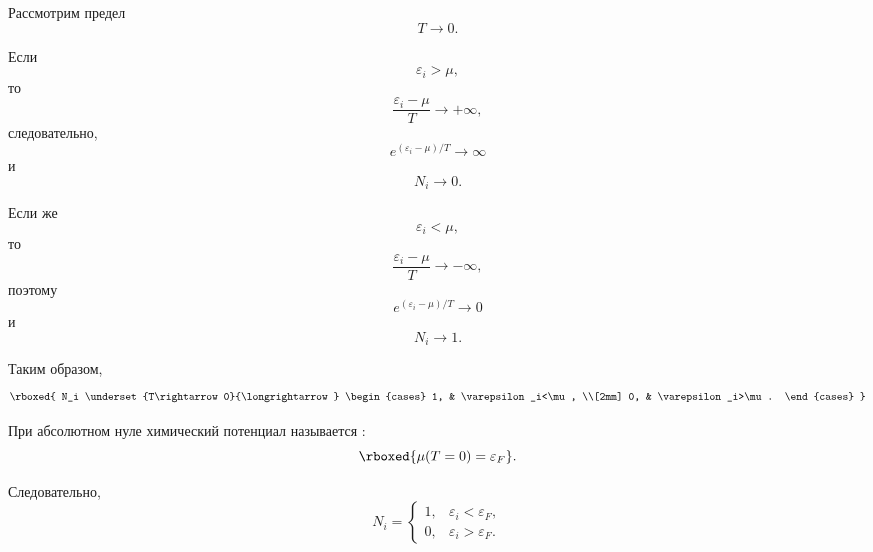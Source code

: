 \documentclass[../final.tex]{subfiles}
\begin{document}
Рассмотрим предел
%
\begin{equation*}
    T
    \rightarrow
    0.
\end{equation*}

Если
%
\begin{equation*}
    \varepsilon_i
    >
    \mu,
\end{equation*}
%
то
%
\begin{equation*}
    \frac{
        \varepsilon_i-\mu
    }{
        T
    }
    \rightarrow
    +\infty,
\end{equation*}
%
следовательно,
%
\begin{equation*}
    e^{(\varepsilon_i-\mu)/T}
    \rightarrow
    \infty
\end{equation*}
%
и
%
\begin{equation*}
    N_i
    \rightarrow
    0.
\end{equation*}

Если же
%
\begin{equation*}
    \varepsilon_i
    <
    \mu,
\end{equation*}
%
то
%
\begin{equation*}
    \frac{
        \varepsilon_i-\mu
    }{
        T
    }
    \rightarrow
    -\infty,
\end{equation*}
%
поэтому
%
\begin{equation*}
    e^{(\varepsilon_i-\mu)/T}
    \rightarrow
    0
\end{equation*}
%
и
%
\begin{equation*}
    N_i
    \rightarrow
    1.
\end{equation*}

Таким образом,
%
\[
    \rboxed{
        N_i
        \underset{T\rightarrow0}{\longrightarrow}
        \begin{cases}
            1,
            &
            \varepsilon_i<\mu,
            \\[2mm]
            0,
            &
            \varepsilon_i>\mu.
        \end{cases}
    }
\]

При абсолютном нуле химический потенциал называется
:
%
\[
    \rboxed{
        \mu(T=0)
        =
        \varepsilon_F
    }.
\]

Следовательно,
%
\begin{equation*}
    N_i
    =
    \begin{cases}
        1,
        &
        \varepsilon_i<\varepsilon_F,
        \\[2mm]
        0,
        &
        \varepsilon_i>\varepsilon_F.
    \end{cases}
\end{equation*}
\end{document}
